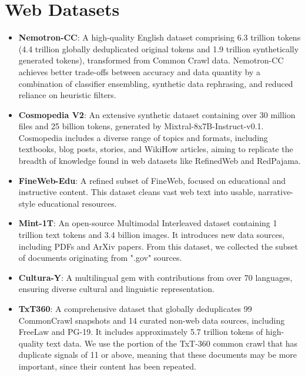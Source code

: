 \section{Web Datasets}
\begin{itemize}
\item \textbf{Nemotron-CC}: A high-quality English dataset comprising 6.3 trillion tokens (4.4 trillion globally deduplicated original tokens and 1.9 trillion synthetically generated tokens), transformed from Common Crawl data. Nemotron-CC achieves better trade-offs between accuracy and data quantity by a combination of classifier ensembling, synthetic data rephrasing, and reduced reliance on heuristic filters.

\item \textbf{Cosmopedia V2}: An extensive synthetic dataset containing over 30 million files and 25 billion tokens, generated by Mixtral-8x7B-Instruct-v0.1. Cosmopedia includes a diverse range of topics and formats, including textbooks, blog posts, stories, and WikiHow articles, aiming to replicate the breadth of knowledge found in web datasets like RefinedWeb and RedPajama.

\item \textbf{FineWeb-Edu}: A refined subset of FineWeb, focused on educational and instructive content. This dataset cleans vast web text into usable, narrative-style educational resources.

\item \textbf{Mint-1T}: An open-source Multimodal Interleaved dataset containing 1 trillion text tokens and 3.4 billion images. It introduces new data sources, including PDFs and ArXiv papers. From this dataset, we collected the subset of documents originating from ".gov" sources.

\item \textbf{Cultura-Y}: A multilingual gem with contributions from over 70 languages, ensuring diverse cultural and linguistic representation.

\item \textbf{TxT360}: A comprehensive dataset that globally deduplicates 99 CommonCrawl snapshots and 14 curated non-web data sources, including FreeLaw and PG-19. It includes approximately 5.7 trillion tokens of high-quality text data. We use the portion of the TxT-360 common crawl that has duplicate signals of 11 or above, meaning that these documents may be more important, since their content has been repeated.
\end{itemize}